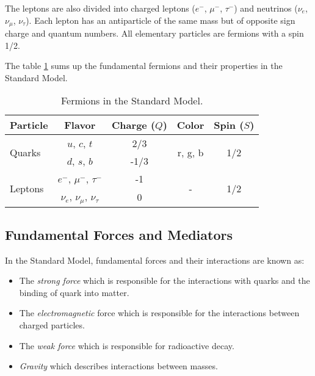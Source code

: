 The leptons are also divided into charged leptons ($e^-$, $\mu^-$, $\tau^-$) and neutrinos ($\nu_e$, $\nu_{\mu}$, $\nu_{\tau}$). Each lepton has an antiparticle of the same mass but of opposite sign charge and quantum numbers. All elementary particles are fermions with a spin 1/2.

The table \ref{table:Fermions} sums up the fundamental fermions and their properties in the Standard Model.

\begin{table}[htb!]
  \centering
  \caption{Fermions in the Standard Model.}
  \label{table:Fermions}
  \begin{tabular}{|p{3cm}||cccc|}
    \hline
    Particle & Flavor & Charge ($Q$) & Color & Spin ($S$)\\
    \hline
    \multirow{2}{*}{Quarks} & $u$, $c$, $t$ & 2/3 & \multirow{2}{*}{r, g, b} & \multirow{2}{*}{1/2}\\
    & $d$, $s$, $b$ & -1/3 & & \\
    \hline
    \multirow{2}{*}{Leptons} & $e^-$, $\mu^-$, $\tau^-$ & -1 & \multirow{2}{*}{-} & \multirow{2}{*}{1/2}\\
    & $\nu_e$, $\nu_{\mu}$, $\nu_{\tau}$ & 0 & & \\
    \hline
  \end{tabular}
\end{table}

\subsection{Fundamental Forces and Mediators}

In the Standard Model, fundamental forces and their interactions are known as:
\begin{itemize}
  \item The \textit{strong force} which is responsible for the interactions with quarks and the binding of quark into matter.
  \item The \textit{electromagnetic} force which is responsible for the interactions between charged particles.
  \item The \textit{weak force} which is responsible for radioactive decay.
  \item \textit{Gravity} which describes interactions between masses.
\end{itemize}

